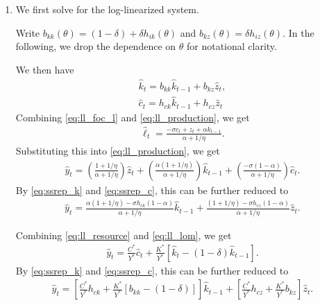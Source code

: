 \documentclass[12pt]{article}
\begin{document}
\begin{enumerate}[label=\arabic*.]
We do not need to recompute the steady state for each candidate $\theta$ because $\rho$ and $\sigma_\varepsilon$ affect only the shock process, while $\phi$ affects only transition dynamics. They are all irrelevant to the steady state. 

\newpage
\item We first solve for the log-linearized system.

Write $b_{kk}(\theta) = (1-\delta)+\delta h_{i k}(\theta)$ and $b_{kz}(\theta) = \delta h_{i z}(\theta)$. In the following, we drop the dependence on $\theta$ for notational clarity.

We then have
\begin{align}
    \hat{k}_t = b_{kk}\hat{k}_{t-1} + b_{kz}\hat{z}_t, \label{eq:ssrep_k}\\
    \hat{c}_t = h_{c k}\hat{k}_{t-1} + h_{c z}\hat{z}_t \label{eq:ssrep_c}
\end{align}
Combining \eqref{eq:ll_foc_l} and \eqref{eq:ll_production}, we get
\begin{align}\label{eq:ll_foc_l_alt}
    \hat{\ell}_t = \frac{-\sigma c_t + z_t + \alpha k_{t-1}}{\alpha + 1/\eta}.
\end{align}
Substituting this into \eqref{eq:ll_production}, we get
\begin{align*} 
    \hat{y}_t = \left(\frac{1+1/\eta}{\alpha + 1/\eta}\right) \hat{z}_t + \left(\frac{\alpha(1+1/\eta)}{\alpha + 1/\eta}\right) \hat{k}_{t-1} + \left(\frac{-\sigma(1-\alpha)}{\alpha + 1/\eta}\right) \hat{c}_t.
\end{align*}
By \eqref{eq:ssrep_k} and \eqref{eq:ssrep_c}, this can be further reduced to
\begin{align}\label{eq:ll_prod_alt}
    \hat{y}_t = \frac{\alpha (1 + 1/\eta) - \sigma h_{ck} (1-\alpha)}{\alpha + 1/\eta} \hat{k}_{t-1} + \frac{(1 + 1/\eta) - \sigma h_{cz} (1-\alpha)}{\alpha + 1/\eta} \hat{z}_t.
\end{align}

Combining \eqref{eq:ll_resource} and \eqref{eq:ll_lom}, we get
\begin{align*}
    \hat{y}_t = \frac{C^*}{Y^*} \hat{c}_t + \frac{K^*}{Y^*} [\hat{k}_t - (1-\delta)\hat{k}_{t-1}].
\end{align*}
By \eqref{eq:ssrep_k} and \eqref{eq:ssrep_c}, this can be further reduced to
\begin{align}\label{eq:ll_resource_alt}
    \hat{y}_t = \left[\frac{C^*}{Y^*}h_{ck} + \frac{K^*}{Y^*}[b_{kk} - (1-\delta)]\right] \hat{k}_{t-1} + \left[\frac{C^*}{Y^*}h_{cz} + \frac{K^*}{Y^*}b_{kz}\right] \hat{z}_t.
\end{align}


\end{enumerate}
\end{document}
